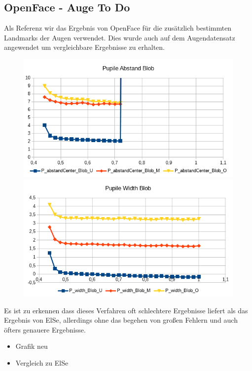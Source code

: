 \subsection{OpenFace - Auge To Do}
Als Referenz wir das Ergebnis von OpenFace für die zusätzlich bestimmten Landmarks der Augen verwendet. Dies wurde auch auf dem Augendatensatz \cite{database_Eye} angewendet um vergleichbare Ergebnisse zu erhalten.
\begin{figure}
	\centering
	\includegraphics[width=0.45\linewidth]{ElSe_Img/OpenFace_Pupile_Abstand}
	\includegraphics[width=0.45\linewidth]{ElSe_Img/OpenFace_Pupile_Width}
	\caption{}
	\label{OpenFace_Eye}
\end{figure}
Es ist zu erkennen dass dieses Verfahren oft schlechtere Ergebnisse liefert als das Ergebnis von ElSe, allerdings ohne das begehen von großen Fehlern und auch öfters genauere Ergebnisse.\\
\begin{itemize}
	\item Grafik neu
	\item Vergleich zu ElSe
\end{itemize}

